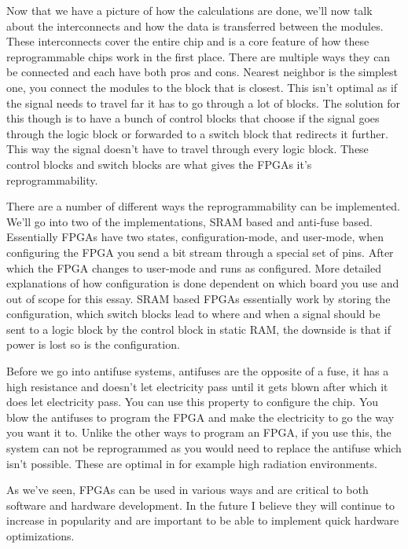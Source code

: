 \documentclass{paper}
\begin{document}
Now that we have a picture of how the calculations are done, we'll
now talk about the interconnects and how the data is transferred between the
modules. These interconnects cover the entire chip and is a core feature of how
these reprogrammable chips work in the first place. There are multiple ways
they can be connected and each have both pros and cons. Nearest neighbor is the
simplest one, you connect the modules to the block that is closest.
This isn't optimal as if the signal needs to travel far it has to go through a
lot of blocks. The solution for this though is to have a bunch of control blocks
that choose if the signal goes through the logic block or forwarded to a
switch block that redirects it further. This way the signal doesn't have to
travel through every logic block. These control blocks and switch blocks are
what gives the FPGAs it's reprogrammability.

There are a number of different ways the reprogrammability can be implemented.
We'll go into two of the implementations, SRAM based and anti-fuse based.
Essentially FPGAs have two states, configuration-mode, and user-mode, when
configuring the FPGA you send a bit stream through a special set of pins. After
which the FPGA changes to user-mode and runs as configured. More detailed
explanations of how configuration is done dependent on which board you use and
out of scope for this essay. SRAM based FPGAs essentially work by storing the
configuration, which switch blocks lead to where and when a signal should be
sent to a logic block by the control block in static RAM, the downside is that
if power is lost so is the configuration.

Before we go into antifuse systems, antifuses are the opposite of a fuse, it
has a high resistance and doesn't let electricity pass until it gets blown
after which it does let electricity pass. You can use this property to
configure the chip. You blow the antifuses to program the FPGA and make the
electricity to go the way you want it to. Unlike the other ways to program an
FPGA, if you use this, the system can not be reprogrammed as you would need to
replace the antifuse which isn't possible. These are optimal in for example
high radiation environments\cite{fpgaradiation}.

As we've seen, FPGAs can be used in various ways and are critical to both
software and hardware development. In the future I believe they will continue
to increase in popularity and are important to be able to implement quick
hardware optimizations.

\printbibliography
\end{document}
